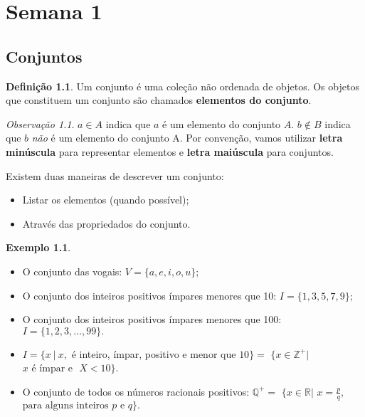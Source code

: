 \documentclass[]{book}
\providecommand{\tightlist}{%
  \setlength{\itemsep}{0pt}\setlength{\parskip}{0pt}}
\theoremstyle{definition}
\newtheorem{definition}{Definição}[chapter]
\theoremstyle{definition}
\newtheorem{example}{Exemplo}[chapter]
\theoremstyle{definition}
\theoremstyle{remark}
\newtheorem*{remark}{Observação}
\begin{document}
\hypertarget{sem1}{%
\chapter{Semana 1}\label{sem1}}

\hypertarget{conjuntos}{%
\section{Conjuntos}\label{conjuntos}}

\begin{definition}
\protect\hypertarget{def:defConj}{}{\label{def:defConj} }Um conjunto é uma coleção não ordenada de objetos.
Os objetos que constituem um conjunto são chamados \textbf{elementos do conjunto}.
\end{definition}

\begin{remark}
\iffalse{} {Observação. } \fi{}\(a \in A\) indica que \(a\) é um elemento do conjunto \(A\).
\(b \notin B\) indica que \(b\) \emph{não} é um elemento do conjunto A.
Por convenção, vamos utilizar \textbf{letra minúscula} para representar elementos e \textbf{letra maiúscula} para conjuntos.
\end{remark}

Existem duas maneiras de descrever um conjunto:

\begin{itemize}
\tightlist
\item
  Listar os elementos (quando possível);
\item
  Através das propriedados do conjunto.
\end{itemize}

\begin{example}
\protect\hypertarget{exm:exInicial}{}{\label{exm:exInicial} }

\begin{itemize}
\item
  O conjunto das vogais: \(V = \{a, e, i, o, u\}\);
\item
  O conjunto dos inteiros positivos ímpares menores que 10: \(I = \{1,3,5,7,9\};\)
\item
  O conjunto dos inteiros positivos ímpares menores que 100: \(I = \{1,2,3,\ldots,99\}.\)
\item
  \(I = \{x\ |\ x,\) é inteiro, ímpar, positivo e menor que \(10 \} =\) \(\{x \in \mathbb{Z}^{+}|\) \(x \text{ é ímpar e }\) \(X < 10\}\).
\item
  O conjunto de todos os números racionais positivos: \(\mathbb{Q}^{+} =\) \(\{x \in \mathbb{R}|\) \(x = \frac{p}{q},\) \(\text{para alguns inteiros $p$ e $q$}\}.\)
\end{itemize}
\end{example}
\end{document}

